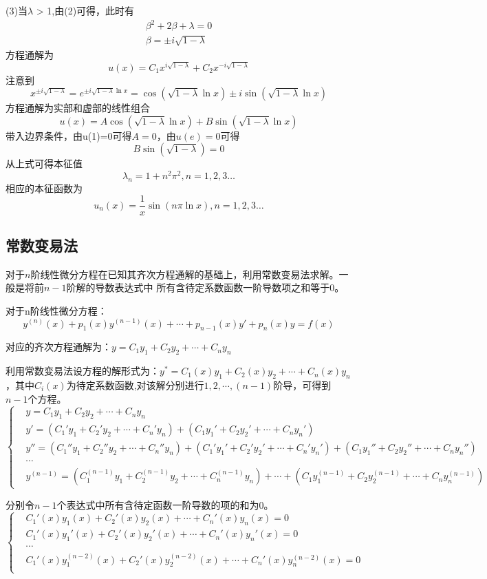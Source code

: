 \documentclass{article}
\begin{document}
(3)当$\lambda$ > 1,由(2)可得，此时有
\begin{align}
    \beta^2 + 2 \beta + \lambda = 0 \nonumber \\
    \beta = \pm i\sqrt{1-\lambda}
    \nonumber
\end{align}
方程通解为
$$  u(x)=C_1x^{i\sqrt{1-\lambda}} + C_2x^{-i\sqrt{1-\lambda}} $$
注意到
$$  x^{\pm i\sqrt{1-\lambda} } = e^{\pm i\sqrt{1-\lambda} \ln x} = \cos(\sqrt{1-\lambda} \ln x) \pm i\sin(\sqrt{1-\lambda} \ln x) $$
方程通解为实部和虚部的线性组合
$$  u(x)=A \cos(\sqrt{1-\lambda} \ln x)  + B \sin(\sqrt{1-\lambda} \ln x) $$
带入边界条件，由u(1)=0可得$A=0$，由$u(e)=0$可得
$$
    B\sin(\sqrt{1-\lambda})  = 0
$$
从上式可得本征值
$$ \lambda_n =  1+ n^2 \pi^2,n=1,2,3 \dots$$
相应的本征函数为
$$ u_n(x) = \frac{1}{x} \sin(n \pi \ln x), n=1,2,3 \dots$$

\subsection{常数变易法}
对于$n$阶线性微分方程在已知其齐次方程通解的基础上，利用常数变易法求解。一般是将前$n-1$阶解的导数表达式中
所有含待定系数函数一阶导数项之和等于0。

对于n阶线性微分方程：
$$
    y^{(n)}(x)+p_1(x)y^{(n-1)}(x)+\cdots+p_{n-1}(x)y'+p_n(x)y=f(x)
$$

对应的齐次方程通解为：$y=C_1y_1+C_2y_2+\cdots+C_ny_n$

利用常数变易法设方程的解形式为：$y^{*}=C_1(x)y_1+C_2(x)y_2+\cdots+C_n(x)y_n$，其中$C_i(x)$为待定系数函数,对该解分别进行$1,2,\cdots,(n-1)$阶导，可得到$n-1$个方程。
$$
    \left\{
    \begin{aligned}
         & y=C_1y_1+C_2y_2+\cdots+C_ny_n                                        \\
         & y'=(C_1'y_1+C_2'y_2+\cdots+C_n'y_n) + (C_1y_1'+C_2y_2'+\cdots+C_ny_n')     \\
         & y''=(C_1''y_1+C_2''y_2+\cdots+C_n''y_n) + (C_1'y_1'+C_2'y_2'+\cdots+C_n'y_n') + (C_1y_1''+C_2y_2''+\cdots+C_ny_n'')       \\
         & \cdots   \\
         & y^{(n-1)}=(C_1^{(n-1)}y_1+C_2^{(n-1)}y_2+\cdots+C_n^{(n-1)}y_n) +\cdots+ (C_1y_1^{(n-1)}+C_2y_2^{(n-1)}+\cdots+C_ny_n^{(n-1)})
    \end{aligned}
    \right.
$$

分别令$n-1$个表达式中所有含待定函数一阶导数的项的和为0。
$$
    \left\{
    \begin{aligned}
         & C_1'(x)y_1(x)+C_2'(x)y_2(x)+\cdots+C_n'(x)y_n(x)  =0 \\
         & C_1'(x)y_1'(x)+C_2'(x)y_2'(x)+\cdots+C_n'(x)y_n'(x)  =0   \\
         & \cdots \\
         & C_1'(x)y_1^{(n-2)}(x)+C_2'(x)y_2^{(n-2)}(x)+\cdots+C_n'(x)y_n^{(n-2)}(x)  =0   \\
    \end{aligned}
    \right.
$$
\end{document}
